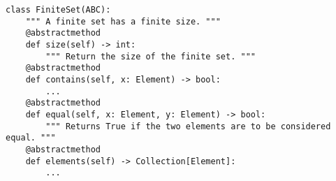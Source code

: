 \begin{verbatim}
class FiniteSet(ABC):
    """ A finite set has a finite size. """
    @abstractmethod
    def size(self) -> int:
        """ Return the size of the finite set. """
    @abstractmethod
    def contains(self, x: Element) -> bool:
        ...
    @abstractmethod
    def equal(self, x: Element, y: Element) -> bool:
        """ Returns True if the two elements are to be considered equal. """
    @abstractmethod
    def elements(self) -> Collection[Element]:
        ...
\end{verbatim}